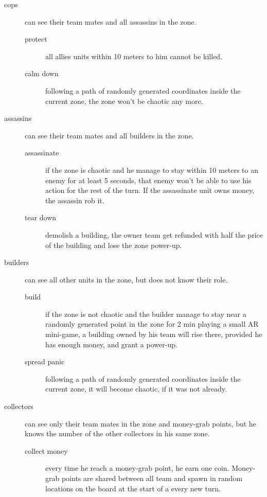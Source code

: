 			\begin{description}
				\item[cops] can see their team mates and all assassins in the zone.
					\begin{description}
						\item[protect] all allies units within 10 meters to him cannot be killed.
						\item[calm down] following a path of randomly generated coordinates inside the current zone, the zone won't be chaotic any more.
					\end{description}
				\item[assassins] can see their team mates and all builders in the zone.
					\begin{description}
						\item[assassinate] if the zone is chaotic and he manage to stay within 10 meters to an enemy for at least 5 seconds, that enemy won't be able to use his action for the rest of the turn. If the assassinate unit owns money, the assassin rob it.
						\item[tear down] demolish a building, the owner team get refunded with half the price of the building and lose the zone power-up.
					\end{description}
				\item[builders] can see all other units in the zone, but does not know their role.
					\begin{description}
						\item[build] if the zone is not chaotic and the builder manage to stay near a randomly generated point in the zone for 2 min playing a small AR mini-game, a building owned by his team will rise there, provided he has enough money, and grant a power-up.
						\item[spread panic] following a path of randomly generated coordinates inside the current zone, it will become chaotic, if it was not already.
					\end{description}
				\item[collectors] can see only their team mates in the zone and money-grab points, but he knows the number of the other collectors in his same zone.
					\begin{description}
						\item[collect money] every time he reach a money-grab point, he earn one coin. Money-grab points are shared between all team and spawn in random locations on the board at the start of a every new turn.
					\end{description}
			\end{description}
			
